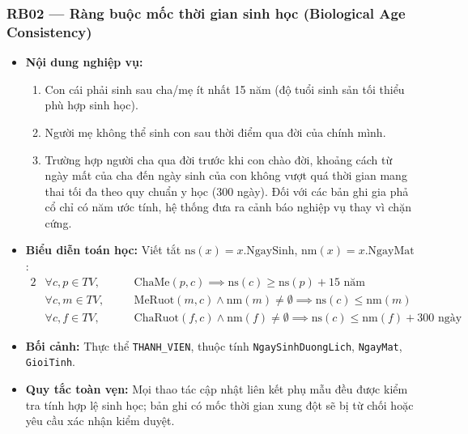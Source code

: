 \subsubsection{RB02 --- Ràng buộc mốc thời gian sinh học (Biological Age Consistency)}
\begin{itemize}
    \item \textbf{Nội dung nghiệp vụ:}
    \begin{enumerate}[label=(\alph*),noitemsep]
        \item Con cái phải sinh sau cha/mẹ ít nhất 15 năm (độ tuổi sinh sản tối thiểu phù hợp sinh học).
        \item Người mẹ không thể sinh con sau thời điểm qua đời của chính mình.
        \item Trường hợp người cha qua đời trước khi con chào đời, khoảng cách từ ngày mất của cha đến ngày sinh của con không vượt quá thời gian mang thai tối đa theo quy chuẩn y học (300 ngày). Đối với các bản ghi gia phả cổ chỉ có năm ước tính, hệ thống đưa ra cảnh báo nghiệp vụ thay vì chặn cứng.
    \end{enumerate}
    \item \textbf{Biểu diễn toán học:} Viết tắt $\text{ns}(x) = x.\text{NgaySinh}$, $\text{nm}(x) = x.\text{NgayMat}$:
    \begin{alignat}{2}
        &\forall c, p \in TV, \quad
        &&\text{ChaMe}(p, c) \implies \text{ns}(c) \ge \text{ns}(p) + 15\text{ năm} \\[3pt]
        &\forall c, m \in TV, \quad
        &&\text{MeRuot}(m, c) \land \text{nm}(m) \ne \emptyset \implies \text{ns}(c) \le \text{nm}(m) \\[3pt]
        &\forall c, f \in TV, \quad
        &&\text{ChaRuot}(f, c) \land \text{nm}(f) \ne \emptyset \implies \text{ns}(c) \le \text{nm}(f) + 300\text{ ngày}
    \end{alignat}
    \item \textbf{Bối cảnh:} Thực thể \texttt{THANH\_VIEN}, thuộc tính \texttt{NgaySinh\-DuongLich}, \texttt{NgayMat}, \texttt{GioiTinh}.
    \item \textbf{Quy tắc toàn vẹn:} Mọi thao tác cập nhật liên kết phụ mẫu đều được kiểm tra tính hợp lệ sinh học; bản ghi có mốc thời gian xung đột sẽ bị từ chối hoặc yêu cầu xác nhận kiểm duyệt.
\end{itemize}

